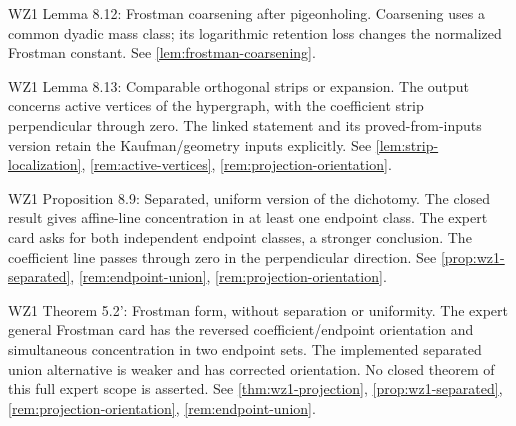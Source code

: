 \begin{remark}
\label{rem:atlas-L8_12}
WZ1 Lemma 8.12: Frostman coarsening after pigeonholing.
Coarsening uses a common dyadic mass class; its logarithmic retention loss changes the normalized Frostman constant.
See \ref{lem:frostman-coarsening}.
\end{remark}

\begin{remark}
\label{rem:atlas-L8_13}
WZ1 Lemma 8.13: Comparable orthogonal strips or expansion.
The output concerns active vertices of the hypergraph, with the coefficient strip perpendicular through zero. The linked statement and its proved-from-inputs version retain the Kaufman/geometry inputs explicitly.
See \ref{lem:strip-localization}, \ref{rem:active-vertices}, \ref{rem:projection-orientation}.
\end{remark}

\begin{remark}
\label{rem:atlas-P8_9}
WZ1 Proposition 8.9: Separated, uniform version of the dichotomy.
The closed result gives affine-line concentration in at least one endpoint class. The expert card asks for both independent endpoint classes, a stronger conclusion. The coefficient line passes through zero in the perpendicular direction.
See \ref{prop:wz1-separated}, \ref{rem:endpoint-union}, \ref{rem:projection-orientation}.
\end{remark}

\begin{remark}
\label{rem:atlas-T5_2p}
WZ1 Theorem 5.2': Frostman form, without separation or uniformity.
The expert general Frostman card has the reversed coefficient/endpoint orientation and simultaneous concentration in two endpoint sets. The implemented separated union alternative is weaker and has corrected orientation. No closed theorem of this full expert scope is asserted.
See \ref{thm:wz1-projection}, \ref{prop:wz1-separated}, \ref{rem:projection-orientation}, \ref{rem:endpoint-union}.
\end{remark}

